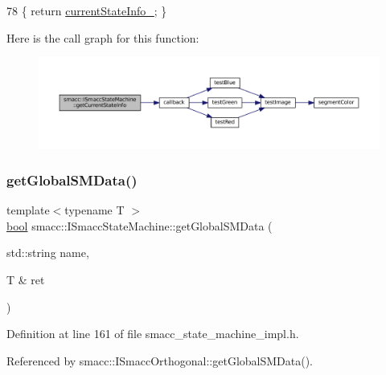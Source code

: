 \begin{DoxyCode}
78 \{ \textcolor{keywordflow}{return} \hyperlink{classsmacc_1_1ISmaccStateMachine_a95e42f735cecdc231ad5372bf9fe7eaf}{currentStateInfo\_}; \}
\end{DoxyCode}
Here is the call graph for this function\+:
\nopagebreak
\begin{figure}[H]
\begin{center}
\leavevmode
\includegraphics[width=350pt]{classsmacc_1_1ISmaccStateMachine_a4738679e8e5f7adab35e610dce0bfff7_cgraph}
\end{center}
\end{figure}
\mbox{\label{classsmacc_1_1ISmaccStateMachine_aeda2d6813c6c428bf318a5792e014b61}} 
\subsubsection{\texorpdfstring{get\+Global\+S\+M\+Data()}{getGlobalSMData()}}
{\footnotesize\ttfamily template$<$typename T $>$ \\
\hyperlink{classbool}{bool} smacc\+::\+I\+Smacc\+State\+Machine\+::get\+Global\+S\+M\+Data (\begin{DoxyParamCaption}\item[{std\+::string}]{name,  }\item[{T \&}]{ret }\end{DoxyParamCaption})}



Definition at line 161 of file smacc\+\_\+state\+\_\+machine\+\_\+impl.\+h.



Referenced by smacc\+::\+I\+Smacc\+Orthogonal\+::get\+Global\+S\+M\+Data().


